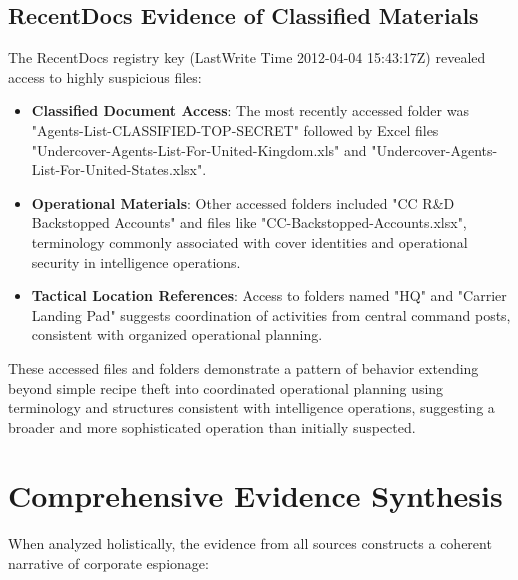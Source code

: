 \subsection{RecentDocs Evidence of Classified Materials}
The RecentDocs registry key (LastWrite Time 2012-04-04 15:43:17Z) revealed access to highly suspicious files:

\begin{itemize}
    \item \textbf{Classified Document Access}: The most recently accessed folder was "Agents-List-CLASSIFIED-TOP-SECRET" followed by Excel files "Undercover-Agents-List-For-United-Kingdom.xls" and "Undercover-Agents-List-For-United-States.xlsx".
    
    \item \textbf{Operational Materials}: Other accessed folders included "CC R\&D Backstopped Accounts" and files like "CC-Backstopped-Accounts.xlsx", terminology commonly associated with cover identities and operational security in intelligence operations.
    
    \item \textbf{Tactical Location References}: Access to folders named "HQ" and "Carrier Landing Pad" suggests coordination of activities from central command posts, consistent with organized operational planning.
\end{itemize}

These accessed files and folders demonstrate a pattern of behavior extending beyond simple recipe theft into coordinated operational planning using terminology and structures consistent with intelligence operations, suggesting a broader and more sophisticated operation than initially suspected.

\section{Comprehensive Evidence Synthesis}
When analyzed holistically, the evidence from all sources constructs a coherent narrative of corporate espionage:


